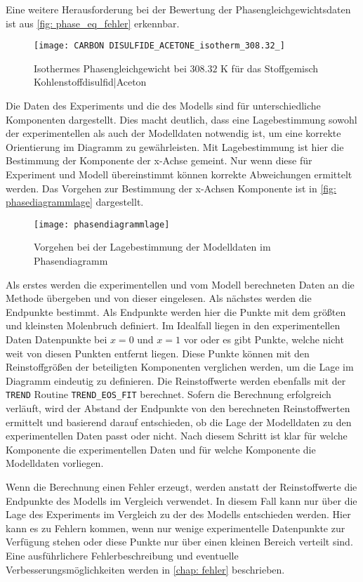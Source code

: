 \documentclass[../thesis.tex]{subfiles}
\begin{document}
Eine weitere Herausforderung bei der Bewertung der Phasengleichgewichtsdaten ist aus \autoref{fig: phase_eq_fehler} erkennbar. 

\begin{figure}[htb]
	\centering
	\texttt{[image: CARBON DISULFIDE\_ACETONE\_isotherm\_308.32\_]}
	\caption{Isothermes Phasengleichgewicht bei $ 308$.$32$ K für das Stoffgemisch Kohlenstoffdisulfid|Aceton}
	\label{fig: phase_eq_fehler}
\end{figure}

Die Daten des Experiments und die des Modells sind für unterschiedliche Komponenten dargestellt. Dies macht deutlich, dass eine Lagebestimmung sowohl der experimentellen als auch der Modelldaten notwendig ist, um eine korrekte Orientierung im Diagramm zu gewährleisten. Mit Lagebestimmung ist hier die Bestimmung der Komponente der x-Achse gemeint. Nur wenn diese für Experiment und Modell übereinstimmt können korrekte Abweichungen ermittelt werden. Das Vorgehen zur Bestimmung der x-Achsen Komponente ist in \autoref{fig: phasediagrammlage} dargestellt.

\begin{figure}[htb]
	\centering
	\texttt{[image: phasendiagrammlage]}
	\caption{Vorgehen bei der Lagebestimmung der Modelldaten im Phasendiagramm}
	\label{fig: phasediagrammlage}
\end{figure}

Als erstes werden die experimentellen und vom Modell berechneten Daten an die Methode übergeben und von dieser eingelesen. Als nächstes werden die Endpunkte bestimmt. Als Endpunkte werden hier die Punkte mit dem größten und kleinsten Molenbruch definiert. Im Idealfall liegen in den experimentellen Daten Datenpunkte bei $x = 0$ und $ x = 1$ vor oder es gibt Punkte, welche nicht weit von diesen Punkten entfernt liegen. Diese Punkte können mit den Reinstoffgrößen der beteiligten Komponenten verglichen werden, um die Lage im Diagramm eindeutig zu definieren. Die Reinstoffwerte werden ebenfalls mit der \texttt{TREND} Routine \texttt{TREND\_EOS\_FIT} berechnet. Sofern die Berechnung erfolgreich verläuft, wird der Abstand der Endpunkte von den berechneten Reinstoffwerten ermittelt und basierend darauf entschieden, ob die Lage der  Modelldaten zu den experimentellen Daten passt oder nicht. Nach diesem Schritt ist klar für welche Komponente die experimentellen Daten und für welche Komponente die Modelldaten vorliegen. 

Wenn die Berechnung einen Fehler erzeugt, werden anstatt der Reinstoffwerte die Endpunkte des Modells im Vergleich verwendet. In diesem Fall kann nur über die Lage des Experiments im Vergleich zu der des Modells entschieden werden. Hier kann es zu Fehlern kommen, wenn nur wenige experimentelle Datenpunkte zur Verfügung stehen oder diese Punkte nur über einen kleinen Bereich verteilt sind. Eine ausführlichere Fehlerbeschreibung und eventuelle Verbesserungsmöglichkeiten werden in \autoref{chap: fehler} beschrieben. 
\end{document}
